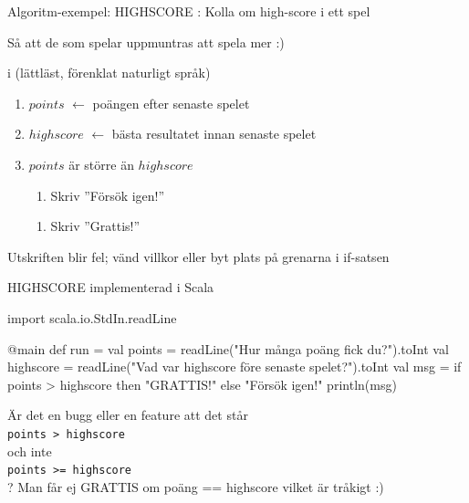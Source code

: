\ifkompendium\else
\begin{SlideExtra}{Algoritm-exempel: HIGHSCORE}
: Kolla om high-score i ett spel \\ \vspace{1em}

 \pause Så att de som spelar uppmuntras att spela mer :) \\ \vspace{1em}

 i  (lättläst, förenklat naturligt språk)\pause
\begin{enumerate}
\item[] $points$ $\leftarrow$ poängen efter senaste spelet
\item[] $highscore$ $\leftarrow$ bästa resultatet innan senaste spelet
\item[]  $points$ är större än $highscore$ 
\begin{enumerate}[ ~~]
\item[]  Skriv ''Försök igen!''
\end{enumerate}
\begin{enumerate}[ ~~]
\item[]  Skriv ''Grattis!''
\end{enumerate}
\end{enumerate}
\pause
\scriptsize {}

\pause Utskriften blir fel; vänd villkor eller byt plats på grenarna i if-satsen
\end{SlideExtra}
\fi

\ifkompendium\else
\begin{SlideExtra}{HIGHSCORE implementerad i Scala}
\begin{Code}
import scala.io.StdIn.readLine

@main def run = 
  val points = readLine("Hur många poäng fick du?").toInt
  val highscore = readLine("Vad var highscore före senaste spelet?").toInt
  val msg = if points > highscore then "GRATTIS!" else "Försök igen!"
  println(msg)
\end{Code}
\SlideFontSmall %
\pause
Är det en bugg eller en feature att det står\\ \texttt{points > highscore} \\ och inte \\ \texttt{points >= highscore} \\ ?
\pause Man får ej GRATTIS om poäng == highscore vilket är tråkigt :)
\end{SlideExtra}



